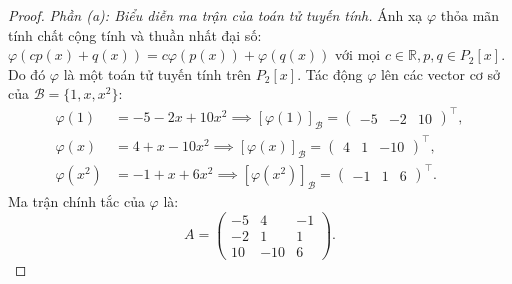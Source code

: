 \documentclass{article}
\begin{document}
\begin{proof}
\emph{Phần (a): Biểu diễn ma trận của toán tử tuyến tính.}
Ánh xạ $\varphi$ thỏa mãn tính chất cộng tính và thuần nhất đại số: $\varphi(c p(x) + q(x)) = c\varphi(p(x)) + \varphi(q(x))$ với mọi $c \in \mathbb{R}, p, q \in P_2[x]$. Do đó $\varphi$ là một toán tử tuyến tính trên $P_2[x]$.
Tác động $\varphi$ lên các vector cơ sở của $\mathcal{B} = \{1, x, x^2\}$:
\begin{align}
    \varphi(1) &= -5 - 2x + 10x^2 \implies [\varphi(1)]_\mathcal{B} = \begin{pmatrix} -5 & -2 & 10 \end{pmatrix}^\top, \\
    \varphi(x) &= 4 + x - 10x^2 \implies [\varphi(x)]_\mathcal{B} = \begin{pmatrix} 4 & 1 & -10 \end{pmatrix}^\top, \\
    \varphi(x^2) &= -1 + x + 6x^2 \implies [\varphi(x^2)]_\mathcal{B} = \begin{pmatrix} -1 & 1 & 6 \end{pmatrix}^\top.
\end{align}
Ma trận chính tắc của $\varphi$ là:
\begin{equation}
    A = \begin{pmatrix}
        -5 & 4 & -1 \\
        -2 & 1 & 1 \\
        10 & -10 & 6
    \end{pmatrix}.
\end{equation}


\end{proof}
\end{document}
